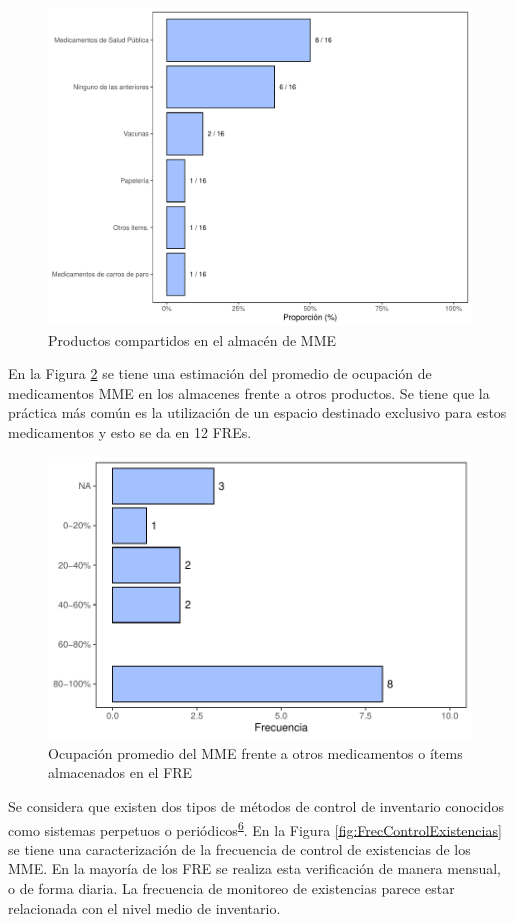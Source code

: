 \documentclass[
]{book}
\begin{document}
\begin{figure}
\includegraphics[width=0.85\linewidth]{InformeFinal_files/figure-latex/ProductosCompartidos1-1} \caption{Productos compartidos en el almacén de MME}\label{fig:ProductosCompartidos1}
\end{figure}

En la Figura \ref{fig:PropOcupacionAlmacen} se tiene una estimación del promedio de ocupación de medicamentos MME en los almacenes frente a otros productos. Se tiene que la práctica más común es la utilización de un espacio destinado exclusivo para estos medicamentos y esto se da en 12 FREs.

\begin{figure}
\includegraphics[width=0.85\linewidth]{InformeFinal_files/figure-latex/PropOcupacionAlmacen-1} \caption{Ocupación promedio del MME frente a otros medicamentos o ítems almacenados en el FRE}\label{fig:PropOcupacionAlmacen}
\end{figure}

Se considera que existen dos tipos de métodos de control de inventario conocidos como sistemas perpetuos o periódicos\textsuperscript{\protect\hyperlink{ref-Silver2017}{6}}.
En la Figura \ref{fig:FrecControlExistencias} se tiene una caracterización de la frecuencia de control de existencias de los MME. En la mayoría de los FRE se realiza esta verificación de manera mensual, o de forma diaria. La frecuencia de monitoreo de existencias parece estar relacionada con el nivel medio de inventario.
\end{document}
